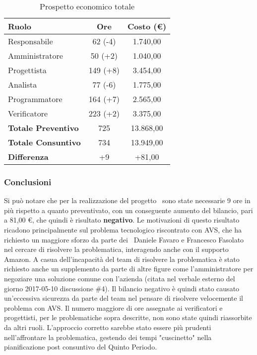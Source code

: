 \documentclass[../PianoDiProgetto_v4.0.0.tex]{subfiles}
\begin{document}
			\begin{table}[h]
				\centering
				\begin{tabular}{l * {2}{c}}
				\toprule
				\textbf{Ruolo} & \textbf{Ore} & \textbf{Costo (\euro{})} \\
				\midrule
				Responsabile & 62 (-4) & 1.740,00 \\
				Amministratore & 50 (+2) & 1.040,00 \\
				Progettista & 149 (+8) & 3.454,00 \\
				Analista & 77 (-6) & 1.775,00 \\		
				Programmatore & 164 (+7) & 2.565,00 \\		
				Verificatore & 223 (+2)  & 3.375,00 \\				
				\midrule		
				\textbf{Totale Preventivo} & 725 & 13.868,00 \\
				\textbf{Totale Consuntivo} & 734  & 13.949,00 \\
				\midrule
				\textbf{Differenza} & +9  & +81,00 \\
				\bottomrule
				\end{tabular}
				\caption{Prospetto economico totale}		
			\end{table}
			
		\subsubsection{Conclusioni}
		Si può notare che per la realizzazione del progetto \atavi\ sono state necessarie 9 ore in più rispetto a quanto preventivato, con un conseguente aumento del bilancio, pari a 81,00 \euro{}, che quindi è risultato \textbf{negativo}.
		Le motivazioni di questo risultato ricadono principalmente sul problema tecnologico riscontrato con AVS, che ha richiesto un maggiore sforzo da parte dei \programmatori\ Daniele Favaro e 
		Francesco Fasolato nel cercare di risolvere la problematica, interagendo anche con il supporto Amazon.
		A casua dell'incapacità del team di risolvere la problematica è stato richiesto anche un supplemento da parte di altre figure come l'amministratore per negoziare una soluzione comune 
		con l'azienda (citata nel verbale esterno del giorno 2017-05-10 discussione \#4).
		Il bilancio negativo è quindi stato causato un'eccessiva sicurezza da parte del team nel pensare di risolvere velocemente il problema con AVS.
		Il numero maggiore di ore assegnate ai verificatori e progettisti, per le problematiche sopra descritte, non sono state quindi riassorbite da altri ruoli.
		L'approccio corretto sarebbe stato essere più prudenti nell'affrontare la problematica, gestendo dei tempi "cuscinetto" nella pianificazione post consuntivo del Quinto Periodo.
		
\end{document}
